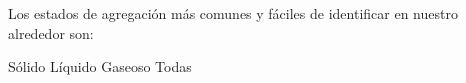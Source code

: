 
\question Los estados de agregación más comunes y fáciles de identificar
  en nuestro alrededor son:

  \begin{oneparchoices}
    \choice Sólido
    \choice Líquido
    \choice Gaseoso
    \CorrectChoice Todas
  \end{oneparchoices}
  \answerline[D]
